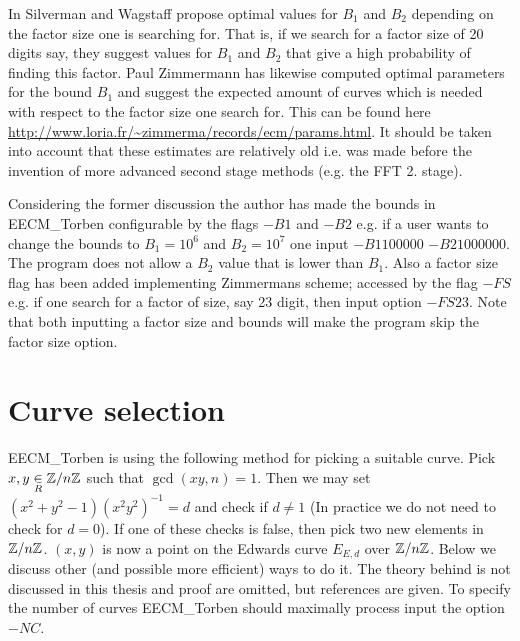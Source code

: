 In \cite{SilvermanWagstaff:1993} Silverman and Wagstaff propose optimal values for $B_1$ and $B_2$ depending on the factor size one is searching for. That is, if we search for a factor size of 20 digits say, they suggest values for $B_1$ and $B_2$ that give a high probability of finding this factor. Paul Zimmermann has likewise computed optimal parameters for the bound $B_1$ and suggest the expected amount of curves which is needed with respect to the factor size one search for. This can be found here \url{http://www.loria.fr/~zimmerma/records/ecm/params.html}. It should be taken into account that these estimates are relatively old i.e. was made before the invention of more advanced second stage methods (e.g. the FFT 2. stage).

Considering the former discussion the author has made the bounds in EECM\_Torben configurable by the flags $-B1$ and $-B2$ e.g. if a user wants to change the bounds to $B_1=10^6$ and $B_2=10^7$ one input $-B1100000$ $-B21000000$. The program does not allow a $B_2$ value that is lower than $B_1$. Also a factor size flag has been added implementing Zimmermans scheme; accessed by the flag $-FS$ e.g. if one search for a factor of size, say 23 digit, then input option $-FS23$. Note that both inputting a factor size and bounds will make the program skip the factor size option. 

\section{Curve selection}
EECM\_Torben is using the following method for picking a suitable curve. Pick $x,y\underset{R}\in \mathbb{Z}/n\mathbb{Z}$ such that $\gcd(xy,n)=1$. Then we may set $(x^2+y^2-1)(x^2y^2)^{-1}=d$ and check if $d\neq 1$ (In practice we do not need to check for $d=0$). If one of these checks is false, then pick two new elements in $\mathbb{Z}/n\mathbb{Z}$. $(x,y)$ is now a point on the Edwards curve $E_{E,d}$ over $\mathbb{Z}/n\mathbb{Z}$. Below we discuss other (and possible more efficient) ways to do it. The theory behind is not discussed in this thesis and proof are omitted, but references are given. To specify the number of curves EECM\_Torben should maximally process input the option $-NC$.

